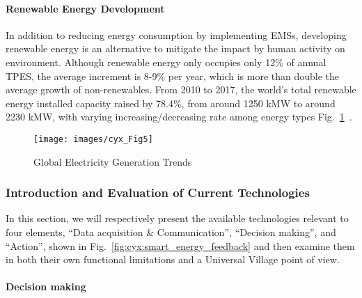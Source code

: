 \documentclass[letterpaper, twocolumn, 10pt, conference]{IEEEtran}
\begin{document}
\paragraph{Renewable Energy Development}

In addition to reducing energy consumption by implementing EMSs, developing renewable energy is an alternative to mitigate the impact by human activity on environment. Although renewable energy only occupies only 12\% of annual TPES, the average increment is 8-9\% per year, which is more than double the average growth of non-renewables. From 2010 to 2017, the world’s total renewable energy installed capacity raised by 78.4\%, from around 1250 kMW to around 2230 kMW, with varying increasing/decreasing rate among energy types Fig.~\ref{fig:cyx:fig5}~\cite{international2017renewables}. 


\begin{figure}[h!]
        \centering
        \texttt{[image: images/cyx\_Fig5]}
        \caption{Global Electricity Generation Trends}
        \label{fig:cyx:fig5}
\end{figure}


\subsubsection{Introduction and Evaluation of Current Technologies}
\label{sssec:cyx:smart_energy:evaluation}

In this section, we will respectively present the available technologies relevant to four elements, \enquote{Data acquisition \& Communication}, \enquote{Decision making}, and  \enquote{Action},  shown in Fig.~\ref{fig:cyx:smart_energy_feedback} and then examine them in both their own functional limitations and a Universal Village point of view.


\paragraph{Decision making}
\end{document}
